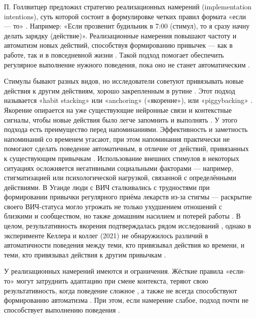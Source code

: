 \documentclass[pdflatex,sn-mathphys-num]{sn-jnl}%
\theoremstyle{thmstyleone}%
\theoremstyle{thmstyletwo}%
\theoremstyle{thmstylethree}%
\begin{document}
П. Голлвитцер предложил стратегию реализационных намерений (implementation intentions), суть которой состоит в формулировке четких правил формата «если — то» \cite{gollwitzer_implementation_1999}. Например: «Если прозвенит будильник в 7:00 (стимул), то я сразу начну делать зарядку (действие)». Реализационные намерения повышают частоту и автоматизм новых действий, способствуя формированию привычек — как в работе, так и в повседневной жизни \cite{Trenz2024Promoting, Holland2006Breaking, Wicaksono2019Using, VanTimmeren2022Instant, ADRIAANSE2011183, lally_2008, tam_2010}. Такой подход помогает обеспечить регулярное выполнение нужного поведения, пока оно не станет автоматическим \cite{Trenz2024Promoting, Holland2006Breaking, Wicaksono2019Using}. 

Стимулы бывают разных видов, но исследователи советуют привязывать новые действия к другим действиям, хорошо закрепленным в рутине \cite{judah_2012, BAYER2022101303, fiorella_2020}. Этот подход называется «habit stacking» или «anchoring» («якорение»), или «piggybacking» \cite{BUABANG202541, rd_what_2023, doi:10.1177/237946151600200109}. Якорение опирается на уже существующие нейронные связи и контекстные сигналы, чтобы новые действия было легче запомнить и выполнять \cite{verplanken_2005, zogg_2011, clear_how_2014}. У этого подхода есть преимущество перед напоминаниями. Эффективность и заметность напоминаний со временем угасают, при этом напоминания практически не помогают сделать поведение автоматичным, в отличие от действий, привязанных к существующим привычкам \cite{stawarz_beyond_2015}. Использование внешних стимулов в некоторых ситуациях осложняется негативными социальными факторами — например, стигматизацией или психологической нагрузкой, связанной с определёнными действиями. В Уганде люди с ВИЧ сталкивались с трудностями при формировании привычки регулярного приёма лекарств из-за стигмы — раскрытие своего ВИЧ-статуса могло угрожать не только ухудшением отношений с близкими и сообществом, но также домашним насилием и потерей работы \cite{Stecher2022Barriers}. В целом, результативность якорения подтверждалась рядом исследований \cite{fournier_2017, https://doi.org/10.1111/bjhp.12263, KELLER201753, Pimm01102016}, однако в эксперименте Келлера и коллег (2021) не обнаружилось различий в автоматичности поведения между теми, кто привязывал действия ко времени, и теми, кто привязывал действия к другим привычкам \cite{https://doi.org/10.1111/bjhp.12504}.

У реализационных намерений имеются и ограничения. Жёсткие правила «если-то» могут затруднить адаптацию при смене контекста, теряют свою результативность, когда поведение сложное \cite{VanTimmeren2022Instant}, а также не всегда способствуют формированию автоматизма \cite{Wicaksono2019Using}. При этом, если намерение слабое, подход почти не способствует выполнению поведения \cite{Prestwich01122003, doi:10.1177/0146167204271308}.
\end{document}
